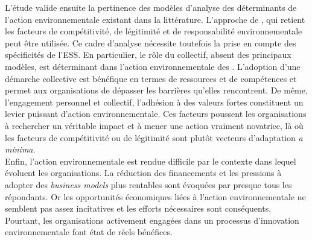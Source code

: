 L'étude valide ensuite la pertinence des modèles d'analyse des déterminants de l'action environnementale existant dans la littérature. L'approche de \textcite{bansal2000why}, qui retient les facteurs de compétitivité, de légitimité et de responsabilité environnementale peut être utilisée. Ce cadre d'analyse nécessite toutefois la prise en compte des spécificités de l'ESS. En particulier, le rôle du collectif, absent des principaux modèles,  est déterminant dans l'action environnementale des \oess. L'adoption d'une démarche collective est bénéfique en termes de ressources et de compétences et permet aux organisations de dépasser les barrières qu'elles rencontrent. De même, l'engagement personnel et collectif, l'adhésion à des valeurs fortes constituent un levier puissant d'action environnementale. Ces facteurs poussent les organisations à rechercher un véritable impact et à mener une action vraiment novatrice, là où les facteurs de compétitivité ou de légitimité sont plutôt vecteurs d'adaptation \textit{a minima}. \\

Enfin, l'action environnementale est rendue difficile par le contexte dans lequel évoluent les organisations. La réduction des financements et les pressions à adopter des \textit{business models} plus rentables sont évoquées par presque tous les répondants. Or les opportunités économiques liées à l'action environnementale ne semblent pas assez incitatives et les efforts nécessaires sont conséquents. Pourtant, les organisations activement engagées dans un processus d'innovation environnementale font état de réels bénéfices. \\
